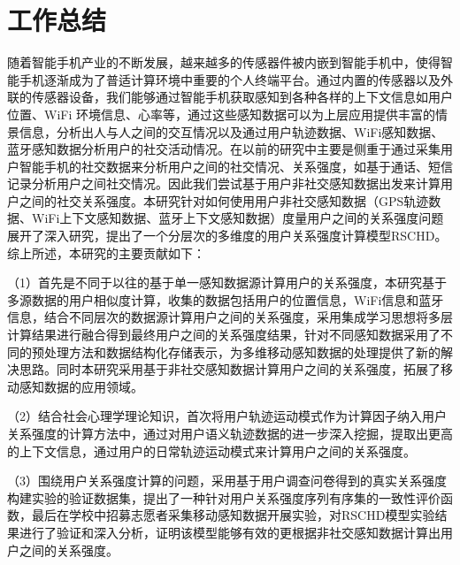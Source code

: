 \section{工作总结}
\label{sec:section6-1}
随着智能手机产业的不断发展，越来越多的传感器件被内嵌到智能手机中，使得智能手机逐渐成为了普适计算环境中重要的个人终端平台。通过内置的传感器以及外联的传感器设备，我们能够通过智能手机获取感知到各种各样的上下文信息如用户位置、WiFi 环境信息、心率等，通过这些感知数据可以为上层应用提供丰富的情景信息，分析出人与人之间的交互情况以及通过用户轨迹数据、WiFi感知数据、蓝牙感知数据分析用户的社交活动情况。在以前的研究中主要是侧重于通过采集用户智能手机的社交数据来分析用户之间的社交情况、关系强度，如基于通话、短信记录分析用户之间社交情况。因此我们尝试基于用户非社交感知数据出发来计算用户之间的社交关系强度。本研究针对如何使用用户非社交感知数据（GPS轨迹数据、WiFi上下文感知数据、蓝牙上下文感知数据）度量用户之间的关系强度问题展开了深入研究，提出了一个分层次的多维度的用户关系强度计算模型RSCHD。 综上所述，本研究的主要贡献如下：
\par （1）首先是不同于以往的基于单一感知数据源计算用户的关系强度，本研究基于多源数据的用户相似度计算，收集的数据包括用户的位置信息，WiFi信息和蓝牙信息，结合不同层次的数据源计算用户之间的关系强度，采用集成学习思想将多层计算结果进行融合得到最终用户之间的关系强度结果，针对不同感知数据采用了不同的预处理方法和数据结构化存储表示，为多维移动感知数据的处理提供了新的解决思路。同时本研究采用基于非社交感知数据计算用户之间的关系强度，拓展了移动感知数据的应用领域。
\par （2）结合社会心理学理论知识，首次将用户轨迹运动模式作为计算因子纳入用户关系强度的计算方法中，通过对用户语义轨迹数据的进一步深入挖掘，提取出更高的上下文信息，通过用户的日常轨迹运动模式来计算用户之间的关系强度。
\par （3）围绕用户关系强度计算的问题，采用基于用户调查问卷得到的真实关系强度构建实验的验证数据集，提出了一种针对用户关系强度序列有序集的一致性评价函数，最后在学校中招募志愿者采集移动感知数据开展实验，对RSCHD模型实验结果进行了验证和深入分析，证明该模型能够有效的更根据非社交感知数据计算出用户之间的关系强度。

